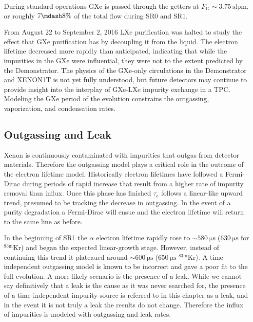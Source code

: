 During standard operations GXe is passed through the getters at $F_{\mathrm{G}} {\sim} 3.75\ \mathrm{slpm}$, or roughly $7 \mdash 8\%$ of
the total flow during SR0 and SR1.

From August 22 to September 2, 2016 LXe purification was halted to study the effect that GXe purification has by
decoupling it from the liquid.  The electron lifetime decreased more rapidly than anticipated, indicating that while the
impurities in the GXe were influential, they were not to the extent predicted by the Demonstrator.  The physics of the GXe-only
circulations in the Demonstrator and XENON1T is not yet fully understood, but future detectors may continue to provide insight into
the interplay of GXe-LXe impurity exchange in a TPC.  Modeling the GXe period of the evolution constrains the outgassing,
vaporization, and condensation rates.



\subsection{Outgassing and Leak}
\label{subsec:electron_lifetime_model_outgassing}
Xenon is continuously contaminated with impurities that outgas from detector materials.  Therefore the outgassing model plays a
critical role in the outcome of the electron lifetime model.  Historically electron lifetimes have followed a Fermi-Dirac during periods
of rapid increase that result from a higher rate of impurity removal than influx.  Once this phase has
finished $\tau_e$ follows a linear-like upward trend, presumed to be tracking the decrease in outgassing.  In the event of a
purity degradation a Fermi-Dirac will ensue and the electron lifetime will return to the same line as before.

In the beginning of SR1 the $\alpha$ electron lifetime rapidly rose to ${\sim} 580\ \mathrm{\mu s}$ ($630\ \mathrm{\mu s}$ for
$\mathrm{^{83m}Kr}$) and began the expected linear-growth stage.  However, instead of continuing this trend
it plateaued around ${\sim} 600\ \mathrm{\mu s}$ ($650\ \mathrm{\mu s}$ $\mathrm{^{83m}Kr}$).  A time-independent outgassing model is
known to be incorrect and
gave a poor fit to the full evolution.  A more likely scenario is the presence of a leak.  While we cannot say definitively that a leak
is the cause as it was never searched for, the presence of a time-independent impurity source is referred to in this chapter as a
leak, and in the event it is not truly a leak the results do not change.  Therefore the influx of impurities is modeled with
outgassing and leak rates.



